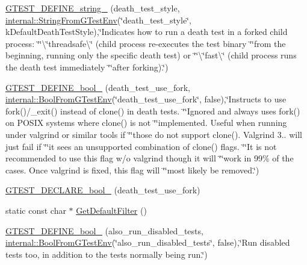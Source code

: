 \begin{DoxyCompactItemize}
\item 
\hyperlink{namespacetesting_ad93c9ec89517d047ed323b79d96df251}{G\+T\+E\+S\+T\+\_\+\+D\+E\+F\+I\+N\+E\+\_\+string\+\_\+} (death\+\_\+test\+\_\+style, \hyperlink{namespacetesting_1_1internal_ac54dabc540bf79c2de91add679bfb93b}{internal\+::\+String\+From\+G\+Test\+Env}(\char`\"{}death\+\_\+test\+\_\+style\char`\"{}, k\+Default\+Death\+Test\+Style),\char`\"{}Indicates how to run a death test in a forked child process\+: \char`\"{}\char`\"{}\textbackslash{}\char`\"{}threadsafe\textbackslash{}\char`\"{} (child process re-\/executes the test binary \char`\"{}\char`\"{}from the beginning, running only the specific death test) or \char`\"{}\char`\"{}\textbackslash{}\char`\"{}fast\textbackslash{}\char`\"{} (child process runs the death test immediately \char`\"{}\char`\"{}after forking).\char`\"{})
\item 
\hyperlink{namespacetesting_afee59458b05682d57d3a389e0903bc01}{G\+T\+E\+S\+T\+\_\+\+D\+E\+F\+I\+N\+E\+\_\+bool\+\_\+} (death\+\_\+test\+\_\+use\+\_\+fork, \hyperlink{namespacetesting_1_1internal_a67132cdce23fb71b6c38ee34ef81eb4c}{internal\+::\+Bool\+From\+G\+Test\+Env}(\char`\"{}death\+\_\+test\+\_\+use\+\_\+fork\char`\"{}, false),\char`\"{}Instructs to use fork()/\+\_\+exit() instead of clone() in death tests. \char`\"{}\char`\"{}Ignored and always uses fork() on P\+O\+S\+IX systems where clone() is not \char`\"{}\char`\"{}implemented. Useful when running under valgrind or similar tools if \char`\"{}\char`\"{}those do not support clone(). Valgrind 3.. will just fail if \char`\"{}\char`\"{}it sees an unsupported combination of clone() flags. \char`\"{}\char`\"{}It is not recommended to use this flag w/o valgrind though it will \char`\"{}\char`\"{}work in 99\% of the cases. Once valgrind is fixed, this flag will \char`\"{}\char`\"{}most likely be removed.\char`\"{})
\item 
\hyperlink{namespacetesting_a534f0743e7c42c55d27dcd0dd3d38f18}{G\+T\+E\+S\+T\+\_\+\+D\+E\+C\+L\+A\+R\+E\+\_\+bool\+\_\+} (death\+\_\+test\+\_\+use\+\_\+fork)
\item 
static const char $\ast$ \hyperlink{namespacetesting_a56fbc164c7dc53596c23e519d8f1ca3c}{Get\+Default\+Filter} ()
\item 
\hyperlink{namespacetesting_aaead7d1aa21cf4a222e10e4c91c21ee5}{G\+T\+E\+S\+T\+\_\+\+D\+E\+F\+I\+N\+E\+\_\+bool\+\_\+} (also\+\_\+run\+\_\+disabled\+\_\+tests, \hyperlink{namespacetesting_1_1internal_a67132cdce23fb71b6c38ee34ef81eb4c}{internal\+::\+Bool\+From\+G\+Test\+Env}(\char`\"{}also\+\_\+run\+\_\+disabled\+\_\+tests\char`\"{}, false),\char`\"{}Run disabled tests too, in addition to the tests normally being run.\char`\"{})

\end{DoxyCompactItemize}
